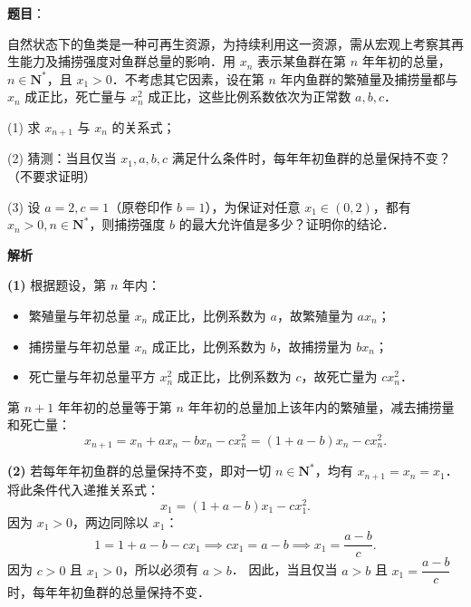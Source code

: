 \begin{answer}

\textbf{题目}：

自然状态下的鱼类是一种可再生资源，为持续利用这一资源，需从宏观上考察其再生能力及捕捞强度对鱼群总量的影响．用 $x_n$ 表示某鱼群在第 $n$ 年年初的总量，$n \in \mathbf{N}^*$，且 $x_1 > 0$．不考虑其它因素，设在第 $n$ 年内鱼群的繁殖量及捕捞量都与 $x_n$ 成正比，死亡量与 $x_n^2$ 成正比，这些比例系数依次为正常数 $a, b, c$．

(1) 求 $x_{n+1}$ 与 $x_n$ 的关系式；

(2) 猜测：当且仅当 $x_1, a, b, c$ 满足什么条件时，每年年初鱼群的总量保持不变？（不要求证明）

(3) 设 $a = 2, c = 1$（原卷印作 $b = 1$），为保证对任意 $x_1 \in (0, 2)$，都有 $x_n > 0, n \in \mathbf{N}^*$，则捕捞强度 $b$ 的最大允许值是多少？证明你的结论．

\textbf{解析}

\textbf{(1)}
根据题设，第 $n$ 年内：
\begin{itemize}
\item 繁殖量与年初总量 $x_n$ 成正比，比例系数为 $a$，故繁殖量为 $ax_n$；
\item 捕捞量与年初总量 $x_n$ 成正比，比例系数为 $b$，故捕捞量为 $bx_n$；
\item 死亡量与年初总量平方 $x_n^2$ 成正比，比例系数为 $c$，故死亡量为 $cx_n^2$．
\end{itemize}

第 $n+1$ 年年初的总量等于第 $n$ 年年初的总量加上该年内的繁殖量，减去捕捞量和死亡量：
\nopagebreak[4]
\[
x_{n+1} = x_n + ax_n - bx_n - cx_n^2 = (1 + a - b)x_n - cx_n^2.
\]

\textbf{(2)}
若每年年初鱼群的总量保持不变，即对一切 $n \in \mathbf{N}^*$，均有 $x_{n+1} = x_n = x_1$．
将此条件代入递推关系式：
\nopagebreak[4]
\[
x_1 = (1 + a - b)x_1 - cx_1^2.
\]
因为 $x_1 > 0$，两边同除以 $x_1$：
\nopagebreak[4]
\[
1 = 1 + a - b - cx_1 \implies cx_1 = a - b \implies x_1 = \frac{a - b}{c}.
\]
因为 $c > 0$ 且 $x_1 > 0$，所以必须有 $a > b$．
因此，当且仅当 $a > b$ 且 $x_1 = \dfrac{a - b}{c}$ 时，每年年初鱼群的总量保持不变．


\end{answer}
